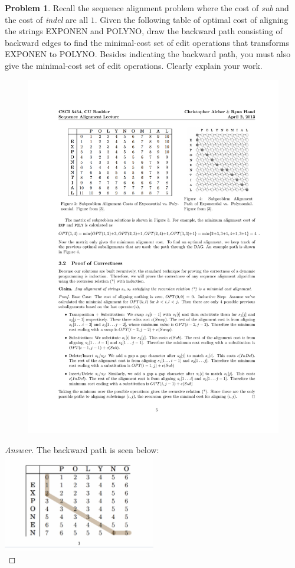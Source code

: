 \documentclass[11pt]{article}
\theoremstyle{definition}
\theoremstyle{definition}
\newtheorem{required}{Problem}
\theoremstyle{definition}
\begin{document}
\newpage
\begin{required}
Recall the sequence alignment problem where the cost of {\em sub} and the cost of {\em indel} are all $1$. Given the following table of optimal cost of aligning the strings EXPONEN and POLYNO, draw the backward path consisting of backward edges to find the minimal-cost set of edit operations that transforms EXPONEN to POLYNO. Besides indicating the backward path, you must also give the minimal-cost set of edit operations.  Clearly explain your work. 
        \begin{figure}[h!]
        \begin{center}
        \includegraphics[scale=0.90]{exp_poly.pdf} 
        \end{center}
        \end{figure}

\begin{proof}[Answer]
The backward path is seen below:  \\
\includegraphics[width=0.5\textwidth]{hw8q2} \\


\end{proof}
\end{required}
\end{document}
